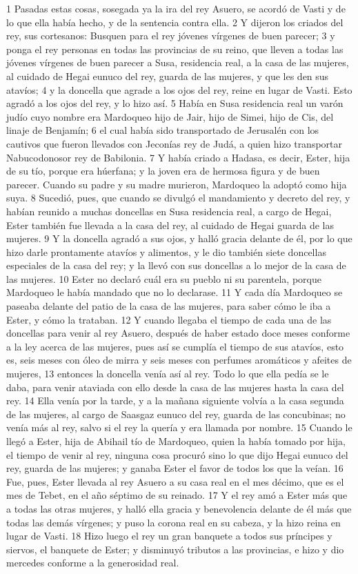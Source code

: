 1 Pasadas estas cosas, sosegada ya la ira del rey Asuero, se acordó de Vasti y de lo que ella había hecho, y de la sentencia contra ella.
2 Y dijeron los criados del rey, sus cortesanos: Busquen para el rey jóvenes vírgenes de buen parecer;
3 y ponga el rey personas en todas las provincias de su reino, que lleven a todas las jóvenes vírgenes de buen parecer a Susa, residencia real, a la casa de las mujeres, al cuidado de Hegai eunuco del rey, guarda de las mujeres, y que les den sus atavíos;
4 y la doncella que agrade a los ojos del rey, reine en lugar de Vasti. Esto agradó a los ojos del rey, y lo hizo así.
5 Había en Susa residencia real un varón judío cuyo nombre era Mardoqueo hijo de Jair, hijo de Simei, hijo de Cis, del linaje de Benjamín;
6 el cual había sido transportado de Jerusalén con los cautivos que fueron llevados con Jeconías rey de Judá, a quien hizo transportar Nabucodonosor rey de Babilonia. 
7 Y había criado a Hadasa, es decir, Ester, hija de su tío, porque era húerfana; y la joven era de hermosa figura y de buen parecer. Cuando su padre y su madre murieron, Mardoqueo la adoptó como hija suya.
8 Sucedió, pues, que cuando se divulgó el mandamiento y decreto del rey, y habían reunido a muchas doncellas en Susa residencia real, a cargo de Hegai, Ester también fue llevada a la casa del rey, al cuidado de Hegai guarda de las mujeres.
9 Y la doncella agradó a sus ojos, y halló gracia delante de él, por lo que hizo darle prontamente atavíos y alimentos, y le dio también siete doncellas especiales de la casa del rey; y la llevó con sus doncellas a lo mejor de la casa de las mujeres. 
10 Ester no declaró cuál era su pueblo ni su parentela, porque Mardoqueo le había mandado que no lo declarase.
11 Y cada día Mardoqueo se paseaba delante del patio de la casa de las mujeres, para saber cómo le iba a Ester, y cómo la trataban.
12 Y cuando llegaba el tiempo de cada una de las doncellas para venir al rey Asuero, después de haber estado doce meses conforme a la ley acerca de las mujeres, pues así se cumplía el tiempo de sus atavíos, esto es, seis meses con óleo de mirra y seis meses con perfumes aromáticos y afeites de mujeres,
13 entonces la doncella venía así al rey. Todo lo que ella pedía se le daba, para venir ataviada con ello desde la casa de las mujeres hasta la casa del rey.
14 Ella venía por la tarde, y a la mañana siguiente volvía a la casa segunda de las mujeres, al cargo de Saasgaz eunuco del rey, guarda de las concubinas; no venía más al rey, salvo si el rey la quería y era llamada por nombre.
15 Cuando le llegó a Ester, hija de Abihail tío de Mardoqueo, quien la había tomado por hija, el tiempo de venir al rey, ninguna cosa procuró sino lo que dijo Hegai eunuco del rey, guarda de las mujeres; y ganaba Ester el favor de todos los que la veían.
16 Fue, pues, Ester llevada al rey Asuero a su casa real en el mes décimo, que es el mes de Tebet, en el año séptimo de su reinado.
17 Y el rey amó a Ester más que a todas las otras mujeres, y halló ella gracia y benevolencia delante de él más que todas las demás vírgenes; y puso la corona real en su cabeza, y la hizo reina en lugar de Vasti.
18 Hizo luego el rey un gran banquete a todos sus príncipes y siervos, el banquete de Ester; y disminuyó tributos a las provincias, e hizo y dio mercedes conforme a la generosidad real.
